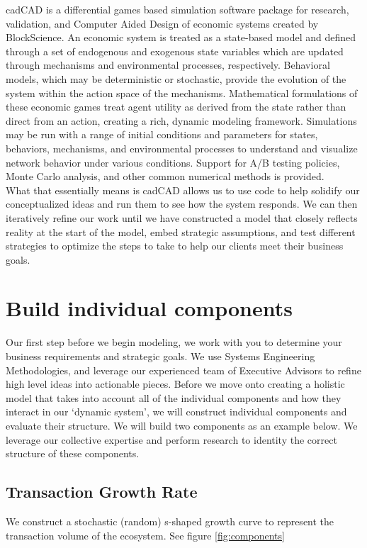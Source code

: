 \documentclass[12pt]{extarticle}
\begin{document}
cadCAD is a differential games based simulation software package for research, validation, and Computer Aided Design of economic systems created by BlockScience. An economic system is treated as a state-based model and defined through a set of endogenous and exogenous state variables which are updated through mechanisms and environmental processes, respectively. Behavioral models, which may be deterministic or stochastic, provide the evolution of the system within the action space of the mechanisms. Mathematical formulations of these economic games treat agent utility as derived from the state rather than direct from an action, creating a rich, dynamic modeling framework. Simulations may be run with a range of initial conditions and parameters for states, behaviors, mechanisms, and environmental processes to understand and visualize network behavior under various conditions. Support for A/B testing policies, Monte Carlo analysis, and other common numerical methods is provided. \\ 

What that essentially means is cadCAD allows us to use code to help solidify our conceptualized ideas and run them to see how the system responds. We can then iteratively refine our work until we have constructed a model that closely reflects reality at the start of the model, embed strategic assumptions, and test different strategies to optimize the steps to take to help our clients meet their business goals. 

\section{Build individual components}
Our first step before we begin modeling, we work with you to determine your business requirements and strategic goals. We use Systems Engineering Methodologies, and leverage our experienced team of Executive Advisors to refine high level ideas into actionable pieces. Before we move onto creating a holistic model that takes into account all of the individual components and how they interact in our `dynamic system', we will construct individual components and evaluate their structure. We will build two components as an example below. We leverage our collective expertise and perform research to identity the correct structure of these components.

\subsection{Transaction Growth Rate}
We construct a stochastic (random) s-shaped growth curve to represent the transaction volume of the ecosystem. See figure \ref{fig:components}
\end{document}
